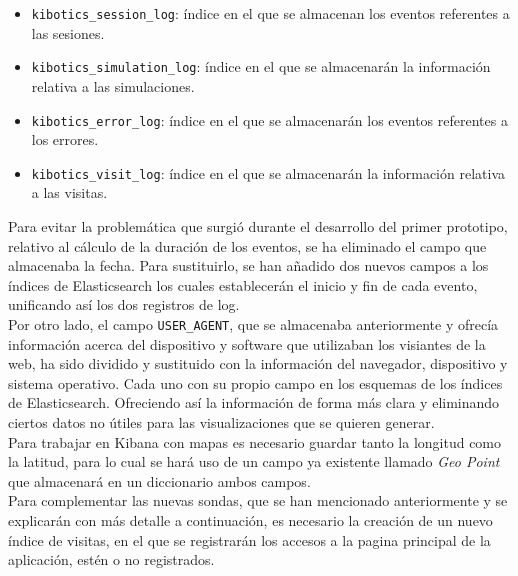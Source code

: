 \documentclass[11pt,a4paper]{book}
\begin{document}
				\begin{itemize}
					\item \texttt{kibotics\_session\_log}: índice en el que se almacenan los eventos referentes a las sesiones.
					
					\item \texttt{kibotics\_simulation\_log}: índice en el que se almacenarán la información relativa a las simulaciones.
					
					\item \texttt{kibotics\_error\_log}: índice en el que se almacenarán los eventos referentes a los errores.
					
					\item \texttt{kibotics\_visit\_log}: índice en el que se almacenarán la información relativa a las visitas.
				\end{itemize}				
								
				Para evitar la problemática que surgió durante el desarrollo del primer prototipo, relativo al cálculo de la duración de los eventos, se ha eliminado el campo que almacenaba la fecha. Para sustituirlo, se han añadido dos nuevos campos a los índices de Elasticsearch los cuales establecerán el inicio y fin de cada evento, unificando así los dos registros de log.\\
				
				Por otro lado, el campo \texttt{USER\_AGENT}, que se almacenaba anteriormente y ofrecía información acerca del dispositivo y software que utilizaban los visiantes de la web, ha sido dividido y sustituido con la información del navegador, dispositivo y sistema operativo. Cada uno con su propio campo en los esquemas de los índices de Elasticsearch. Ofreciendo así la información de forma más clara y eliminando ciertos datos no útiles para las visualizaciones que se quieren generar.\\
				
				Para trabajar en Kibana con mapas es necesario guardar tanto la longitud como la latitud, para lo cual se hará uso de un campo ya existente llamado \textit{Geo Point} que almacenará en un diccionario ambos campos.\\
								
				Para complementar las nuevas sondas, que se han mencionado anteriormente y se explicarán con más detalle a continuación, es necesario la creación de un nuevo índice de visitas, en el que se registrarán los accesos a la pagina principal de la aplicación, estén o no registrados.\\
								
\end{document}
